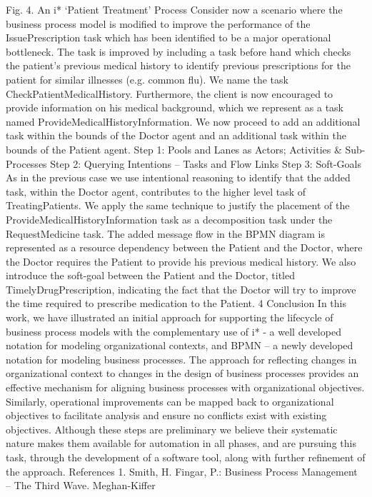 Fig. 4. An i* ‘Patient Treatment’ Process
Consider now a scenario where the business process model is modified to improve
the performance of the IssuePrescription task which has been identified to be a major
operational bottleneck. The task is improved by including a task before hand which
checks the patient’s previous medical history to identify previous prescriptions for the
patient for similar illnesses (e.g. common flu). We name the task CheckPatientMedicalHistory. Furthermore, the client is now encouraged to provide information on his
medical background, which we represent as a task named ProvideMedicalHistoryInformation. We now proceed to add an additional task within the bounds of the Doctor
agent and an additional task within the bounds of the Patient agent.
Step 1:
Pools and
Lanes as Actors;
Activities &
Sub-Processes
Step 2:
Querying
Intentions –
Tasks and
Flow Links
Step 3:
Soft-Goals
As in the previous case we use intentional reasoning to identify that the added task,
within the Doctor agent, contributes to the higher level task of TreatingPatients. We
apply the same technique to justify the placement of the ProvideMedicalHistoryInformation task as a decomposition task under the RequestMedicine task.
The added message flow in the BPMN diagram is represented as a resource dependency between the Patient and the Doctor, where the Doctor requires the Patient
to provide his previous medical history. We also introduce the soft-goal between the
Patient and the Doctor, titled TimelyDrugPrescription, indicating the fact that the
Doctor will try to improve the time required to prescribe medication to the Patient.
4 Conclusion
In this work, we have illustrated an initial approach for supporting the lifecycle of
business process models with the complementary use of i* - a well developed notation for modeling organizational contexts, and BPMN – a newly developed notation
for modeling business processes. The approach for reflecting changes in organizational context to changes in the design of business processes provides an effective
mechanism for aligning business processes with organizational objectives. Similarly,
operational improvements can be mapped back to organizational objectives to facilitate analysis and ensure no conflicts exist with existing objectives. Although these
steps are preliminary we believe their systematic nature makes them available for
automation in all phases, and are pursuing this task, through the development of a
software tool, along with further refinement of the approach.
References
1. Smith, H. Fingar, P.: Business Process Management – The Third Wave. Meghan-Kiffer
